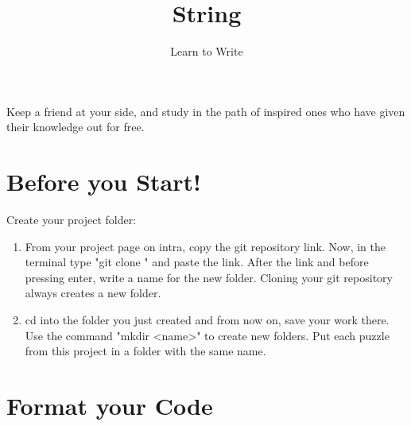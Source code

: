 \documentclass{42-en}
\begin{document}
\title{String}
\subtitle{Learn to Write}


\summary
{
	Keep a friend at your side, and study in the path of inspired ones who have given their knowledge out for free. 
}

\maketitle

\tableofcontents


\chapter{Before you Start!}

Create your project folder:
	\begin{enumerate}
		\item From your project page on intra, copy the git repository link. Now, in the terminal type "git clone " and paste the link. After the link and before pressing enter, write a name for the new folder. Cloning your git repository always creates a new folder.
		\item cd into the folder you just created and from now on, save your work there. Use the command "mkdir <name>" to create new folders. Put each puzzle from this project in a folder with the same name.
	\end{enumerate}



\chapter{Format your Code}
\end{document}
